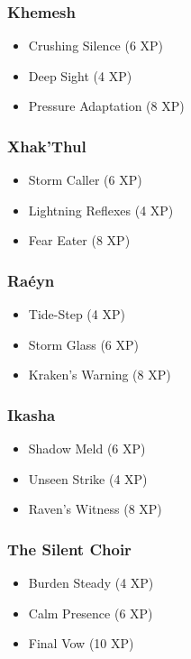 \subsubsection{Khemesh}
\begin{itemize}
\item Crushing Silence (6 XP)
\item Deep Sight (4 XP)
\item Pressure Adaptation (8 XP)
\end{itemize}

\subsubsection{Xhak'Thul}
\begin{itemize}
\item Storm Caller (6 XP)
\item Lightning Reflexes (4 XP)
\item Fear Eater (8 XP)
\end{itemize}

\subsubsection{Raéyn}
\begin{itemize}
\item Tide-Step (4 XP)
\item Storm Glass (6 XP)
\item Kraken's Warning (8 XP)
\end{itemize}

\subsubsection{Ikasha}
\begin{itemize}
\item Shadow Meld (6 XP)
\item Unseen Strike (4 XP)
\item Raven's Witness (8 XP)
\end{itemize}

\subsubsection{The Silent Choir}
\begin{itemize}
\item Burden Steady (4 XP)
\item Calm Presence (6 XP)
\item Final Vow (10 XP)
\end{itemize}

